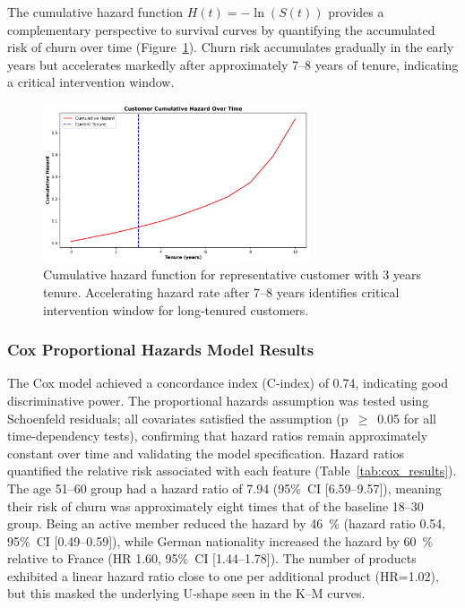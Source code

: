 \documentclass[12pt]{article}
\begin{document}
The cumulative hazard function \(H(t) = -\ln(S(t))\) provides a complementary perspective to survival curves by quantifying the accumulated risk of churn over time (Figure~\ref{fig:cumulative_hazard}). Churn risk accumulates gradually in the early years but accelerates markedly after approximately 7–8 years of tenure, indicating a critical intervention window.

\begin{figure}[H]
\centering
\includegraphics[width=0.7\textwidth]{img/cumulative_hazard_plot.png}
\caption{Cumulative hazard function for representative customer with 3 years tenure. Accelerating hazard rate after 7–8 years identifies critical intervention window for long‑tenured customers.}
\label{fig:cumulative_hazard}
\end{figure}

\subsubsection{Cox Proportional Hazards Model Results}
The Cox model achieved a concordance index (C‑index) of 0.74, indicating good discriminative power. The proportional hazards assumption was tested using Schoenfeld residuals; all covariates satisfied the assumption (p~$\geq$~0.05 for all time-dependency tests), confirming that hazard ratios remain approximately constant over time and validating the model specification. Hazard ratios quantified the relative risk associated with each feature (Table~\ref{tab:cox_results}). The age 51–60 group had a hazard ratio of 7.94 (95\%~CI [6.59–9.57]), meaning their risk of churn was approximately eight times that of the baseline 18–30 group. Being an active member reduced the hazard by 46~\% (hazard ratio 0.54, 95\%~CI [0.49–0.59]), while German nationality increased the hazard by 60~\% relative to France (HR 1.60, 95\%~CI [1.44–1.78]). The number of products exhibited a linear hazard ratio close to one per additional product (HR=1.02), but this masked the underlying U‑shape seen in the K–M curves.
\end{document}
